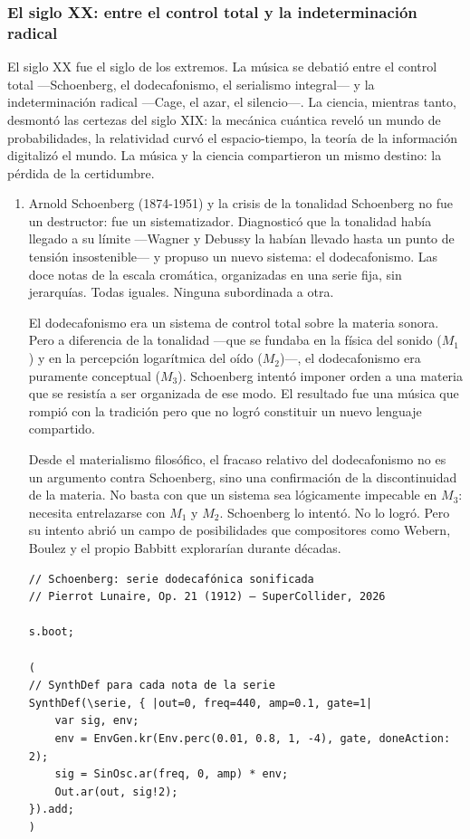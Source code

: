 \documentclass[14pt, a4paper]{article}
\begin{document}
\subsubsection{El siglo XX: entre el control total y la indeterminación radical}
\label{siglo-xx}
El siglo XX fue el siglo de los extremos. La música se debatió entre
el control total —Schoenberg, el dodecafonismo, el serialismo
integral— y la indeterminación radical —Cage, el azar, el silencio—.
La ciencia, mientras tanto, desmontó las certezas del siglo XIX: la
mecánica cuántica reveló un mundo de probabilidades, la relatividad
curvó el espacio-tiempo, la teoría de la información digitalizó el
mundo. La música y la ciencia compartieron un mismo destino: la
pérdida de la certidumbre.
\begin{enumerate}
\item Arnold Schoenberg (1874-1951) y la crisis de la tonalidad
\label{schoenberg-siglo-xx}
Schoenberg no fue un destructor: fue un sistematizador. Diagnosticó
que la tonalidad había llegado a su límite —Wagner y Debussy la habían
llevado hasta un punto de tensión insostenible— y propuso un nuevo
sistema: el dodecafonismo. Las doce notas de la escala cromática,
organizadas en una serie fija, sin jerarquías. Todas iguales. Ninguna
subordinada a otra.

El dodecafonismo era un sistema de control total sobre la materia
sonora. Pero a diferencia de la tonalidad —que se fundaba en la física
del sonido (\(M_1\)) y en la percepción logarítmica del oído (\(M_2\))—,
el dodecafonismo era puramente conceptual (\(M_3\)). Schoenberg intentó
imponer orden a una materia que se resistía a ser organizada de ese
modo. El resultado fue una música que rompió con la tradición pero que
no logró constituir un nuevo lenguaje compartido.

Desde el materialismo filosófico, el fracaso relativo del
dodecafonismo no es un argumento contra Schoenberg, sino una
confirmación de la discontinuidad de la materia. No basta con que un
sistema sea lógicamente impecable en \(M_3\): necesita entrelazarse con
\(M_1\) y \(M_2\). Schoenberg lo intentó. No lo logró. Pero su intento
abrió un campo de posibilidades que compositores como Webern, Boulez
y el propio Babbitt explorarían durante décadas.

\begin{verbatim}
// Schoenberg: serie dodecafónica sonificada
// Pierrot Lunaire, Op. 21 (1912) — SuperCollider, 2026

s.boot;

(
// SynthDef para cada nota de la serie
SynthDef(\serie, { |out=0, freq=440, amp=0.1, gate=1|
    var sig, env;
    env = EnvGen.kr(Env.perc(0.01, 0.8, 1, -4), gate, doneAction: 2);
    sig = SinOsc.ar(freq, 0, amp) * env;
    Out.ar(out, sig!2);
}).add;
)


\end{verbatim}
\end{enumerate}
\end{document}
